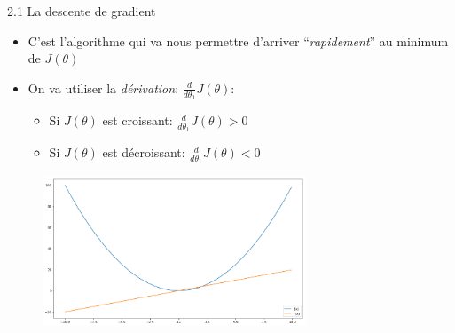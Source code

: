 \begin{frame}{2.1 La descente de gradient}
  \begin{itemize}
  \item C'est l'algorithme qui va nous permettre d'arriver ``\textit{rapidement}'' au minimum de $J(\theta)$ 
    \vspace{0.2cm}
  \item On va utiliser la \textit{dérivation}: $\frac{d}{d\theta_{1}}J(\theta)$:
    \begin{itemize}
    \item Si $J(\theta)$ est croissant: $\frac{d}{d\theta_{1}}J(\theta) > 0$
    \item Si $J(\theta)$ est décroissant: $\frac{d}{d\theta_{1}}J(\theta) < 0$
    \end{itemize}
  \end{itemize}
  \vspace{-0.5cm}
  \begin{figure}
    \includegraphics[width=0.7\textwidth]{fig/derivation.png}
  \end{figure}
  \vspace{-0.5cm}
\end{frame}


